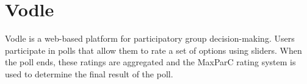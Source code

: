 \section{Vodle}
Vodle is a web-based platform for participatory group decision-making. Users participate in polls that allow them to rate a set of options using sliders. When the poll ends, these ratings are aggregated and the MaxParC rating system is used to determine the final result of the poll.





